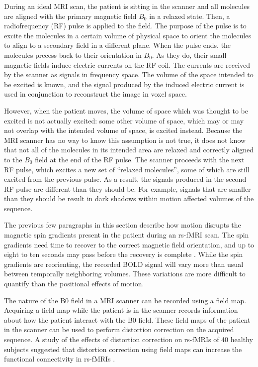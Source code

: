 During an ideal MRI scan, the patient is sitting in the scanner and all molecules are aligned with the primary magnetic field $B_0$ in a relaxed state. Then, a radiofrequency (RF) pulse is applied to the field. The purpose of the pulse is to excite the molecules in a certain volume of physical space to orient the molecules to align to a secondary field in a different plane. When the pulse ends, the molecules precess back to their orientation in $B_0$. As they do, their small magnetic fields induce electric currents on the RF coil. The currents are received by the scanner as signals in frequency space. The volume of the space intended to be excited is known, and the signal produced by the induced electric current is used in conjunction to reconstruct the image in voxel space.

However, when the patient moves, the volume of space which was thought to be excited is not actually excited: some other volume of space, which may or may not overlap with the intended volume of space, is excited instead. Because the MRI scanner has no way to know this assumption is not true, it does not know that not all of the molecules in its intended area are relaxed and correctly aligned to the $B_0$ field at the end of the RF pulse. The scanner proceeds with the next RF pulse, which excites a new set of ``relaxed molecules'', some of which are still excited from the previous pulse. As a result, the signals produced in the second RF pulse are different than they should be. For example, signals that are smaller than they should be result in dark shadows within motion affected volumes of the sequence.

The previous few paragraphs in this section describe how motion disrupts the magnetic spin gradients present in the patient during an rs-fMRI scan. The spin gradients need time to recover to the correct magnetic field orientation, and up to eight to ten seconds may pass before the recovery is complete \cite{Power2014}. While the spin gradients are reorienting, the recorded BOLD signal will vary more than usual between temporally neighboring volumes. These variations are more difficult to quantify than the positional effects of motion.

The nature of the B0 field in a MRI scanner can be recorded using a field map. Acquiring a field map while the patient is in the scanner records information about how the patient interact with the B0 field. These field maps of the patient in the scanner can be used to perform distortion correction on the acquired sequence. A study of the effects of distortion correction on rs-fMRIs of 40 healthy subjects suggested that distortion correction using field maps can increase the functional connectivity in rs-fMRIs \cite{Togo2017}.


